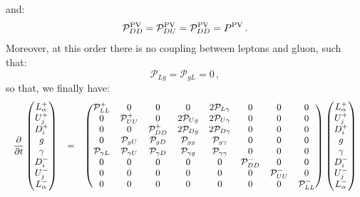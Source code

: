 \documentclass[10pt,a4paper]{article}
\begin{document}
and:
\begin{equation}
 \mathcal{P}^{\rm PV}_{DD} = \mathcal{P}^{\rm PV}_{DU} =
 \mathcal{P}^{\rm PV}_{DD} = P^{\rm PV}\,.
\end{equation}
Moreover, at this order there is no coupling between leptons and
gluon, such that:
\begin{equation}
  \mathcal{P}_{Lg} = \mathcal{P}_{gL} = 0\,,
\end{equation}
so that, we finally have:
\begin{equation}
\small
\begin{array}{rcl}
\displaystyle 
\frac{\partial}{\partial t}
\begin{pmatrix}
L_\alpha^+\\
U_j^+ \\
D_i^+\\
g\\
\gamma\\
D_i^-\\
U_j^-\\
L_\alpha^-
\end{pmatrix} &=&
\displaystyle 
\begin{pmatrix}
\mathcal{P}_{LL}^+ & 0 & 0 & 0 & 2\mathcal{P}_{L\gamma} & 0 & 0 & 0 \\ 
0 & \mathcal{P}_{UU}^+ & 0 & 2\mathcal{P}_{Ug} & 2\mathcal{P}_{U\gamma} & 0 & 0 & 0 \\ 
0 & 0 & \mathcal{P}_{DD}^+ & 2\mathcal{P}_{Dg} & 2\mathcal{P}_{D\gamma} & 0 & 0 & 0 \\ 
0 & \mathcal{P}_{gU} & \mathcal{P}_{gD} & \mathcal{P}_{gg} & \mathcal{P}_{g\gamma}& 0 & 0 & 0\\
\mathcal{P}_{\gamma L} & \mathcal{P}_{\gamma U} & \mathcal{P}_{\gamma D} & \mathcal{P}_{\gamma g} & \mathcal{P}_{\gamma\gamma} & 0 & 0 & 0\\
0 & 0 & 0 & 0 & 0 & \mathcal{P}_{DD}^- & 0 & 0\\
0 & 0 & 0 & 0 & 0 & 0 & \mathcal{P}_{UU}^- & 0\\
0 & 0 & 0 & 0 & 0 & 0 & 0 & \mathcal{P}_{LL}^-
\end{pmatrix}
\begin{pmatrix}
L_\alpha^+\\
U_j^+\\
D_i^+\\
g\\
\gamma\\
D_i^-\\
U_j^-\\
L_\alpha^-
\end{pmatrix}\\

\end{array}
\end{equation}
\end{document}
